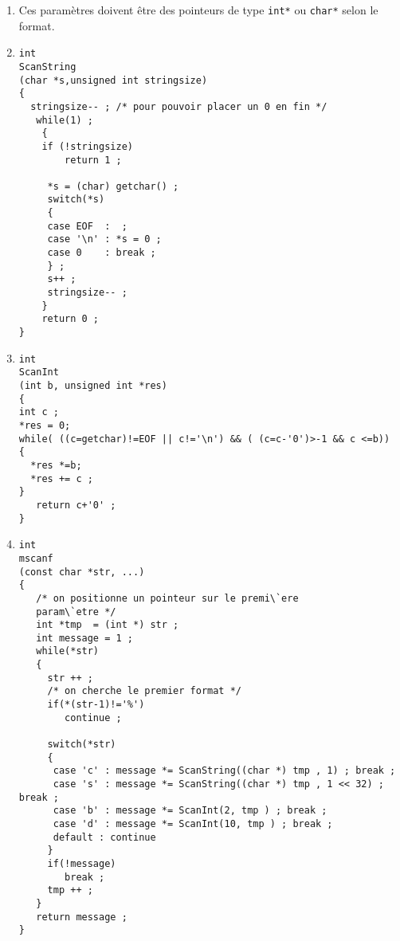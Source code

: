 \ifcorrection
  \begin{correction}
    \begin{enumerate}
    \item Ces param\`etres doivent \^etre des pointeurs de type
      \verb+int*+ ou \verb+char*+ selon le format.
    \item
\begin{verbatim}
int 
ScanString
(char *s,unsigned int stringsize)
{
  stringsize-- ; /* pour pouvoir placer un 0 en fin */   
   while(1) ;
    {
	if (!stringsize)
		return 1 ;

     *s = (char) getchar() ;
     switch(*s)
     { 
     case EOF  :  ;
     case '\n' : *s = 0 ;
     case 0    : break ;
     } ;
     s++ ;
     stringsize-- ;
    }
    return 0 ;
}
\end{verbatim}
    \item
\begin{verbatim}
int 
ScanInt
(int b, unsigned int *res)
{
int c ;
*res = 0;
while( ((c=getchar)!=EOF || c!='\n') && ( (c=c-'0')>-1 && c <=b))
{
  *res *=b;
  *res += c ;
}
   return c+'0' ;
}
\end{verbatim}
    \item 
\begin{verbatim}
int 
mscanf
(const char *str, ...)
{
   /* on positionne un pointeur sur le premi\`ere 
   param\`etre */
   int *tmp  = (int *) str ;
   int message = 1 ;
   while(*str)
   {
     str ++ ;
     /* on cherche le premier format */
     if(*(str-1)!='%')
        continue ;

     switch(*str)
     {
      case 'c' : message *= ScanString((char *) tmp , 1) ; break ;
      case 's' : message *= ScanString((char *) tmp , 1 << 32) ; break ;
      case 'b' : message *= ScanInt(2, tmp ) ; break ;
      case 'd' : message *= ScanInt(10, tmp ) ; break ;
      default : continue
     }
     if(!message)
        break ;
     tmp ++ ;
   }
   return message ;
}
\end{verbatim}
    \end{enumerate}
  \end{correction}
\fi
